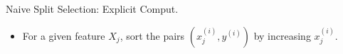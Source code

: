 \documentclass[10pt,compress,t,notes=noshow, xcolor=table]{beamer}
\begin{document}
\begin{frame}{Naive Split Selection: Explicit Comput.}
\begin{itemize}
  \item For a given feature \( X_j \), sort the pairs \( (x_j^{(i)}, y^{(i)}) \) by increasing \( x_j^{(i)} \).


\end{itemize}
\end{frame}
\end{document}
